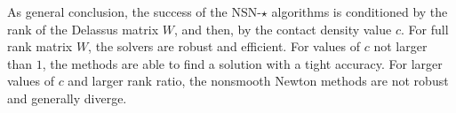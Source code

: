 As general conclusion, the success of the {\sf NSN-$\star$} algorithms is conditioned by  the rank of the Delassus matrix $W$, and then, by the contact density value $c$. For full rank matrix $W$, the solvers are robust and efficient. For values of $c$ not larger than $1$, the methods are able to find a solution with a tight accuracy. For larger values of $c$ and larger rank ratio, the nonsmooth Newton methods are not robust and generally diverge.

\begin{figure}
  \centering
    \subfiglayout
  \\

\end{figure}

